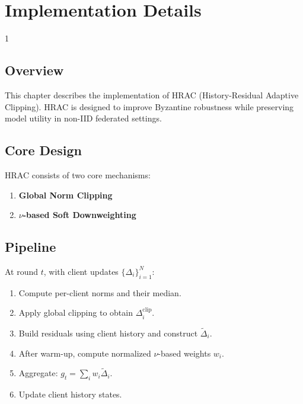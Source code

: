 \documentclass[12pt]{report}
\newcommand{\thesisspacing}{\doublespacing}
\begin{document}
\doublespacing %

\chapter{Implementation Details}
\label{ch1}

\begin{spacing}{1} %
\minitoc %
\end{spacing} %
\thesisspacing %

\section{Overview}

This chapter describes the implementation of HRAC (History-Residual Adaptive Clipping). HRAC is designed to improve Byzantine robustness while preserving model utility in non-IID federated settings.

\section{Core Design}

HRAC consists of two core mechanisms:
\begin{enumerate}
    \item \textbf{Global Norm Clipping}
    \item \textbf{$\nu$-based Soft Downweighting}
\end{enumerate}

\section{Pipeline}

At round $t$, with client updates $\{\Delta_i\}_{i=1}^{N}$:
\begin{enumerate}
    \item Compute per-client norms and their median.
    \item Apply global clipping to obtain $\Delta_i^{\mathrm{clip}}$.
    \item Build residuals using client history and construct $\tilde{\Delta}_i$.
    \item After warm-up, compute normalized $\nu$-based weights $w_i$.
    \item Aggregate: $g_t=\sum_i w_i\tilde{\Delta}_i$.
    \item Update client history states.
\end{enumerate}
\end{document}
